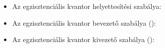 \begin{itemize}
\item Az egzisztenciális kvantor helyettesítési szabálya:
\begin{code}%
%
\>[6]\AgdaSpace{}%
\AgdaSymbol{:}\AgdaSpace{}%
\AgdaSpace{}%
\AgdaSpace{}%
\AgdaSymbol{\}\{}\AgdaSpace{}%
\AgdaSymbol{:}\AgdaSpace{}%
\AgdaSpace{}%
\AgdaSpace{}%
\AgdaSymbol{\}}\AgdaSpace{}%
\AgdaSpace{}%
\AgdaSpace{}%
\AgdaSpace{}%
\AgdaOperator{\AgdaField{[}}\AgdaSpace{}%
\AgdaSpace{}%
\AgdaOperator{\AgdaField{]ᶠ}}\AgdaSpace{}%
\AgdaSpace{}%
\AgdaSpace{}%
\AgdaSymbol{(}\AgdaSpace{}%
\AgdaOperator{\AgdaField{[}}\AgdaSpace{}%
\AgdaSpace{}%
\AgdaSpace{}%
\AgdaSpace{}%
\AgdaSpace{}%
\AgdaSpace{}%
\AgdaOperator{\AgdaField{]ᶠ}}\AgdaSymbol{)}\<%
\end{code}
\item Az egzisztenciális kvantor bevezető szabálya ():
\begin{code}%
%
\>[6]\AgdaSpace{}%
\AgdaSymbol{:}\AgdaSpace{}%
\AgdaSpace{}%
\AgdaSymbol{\}}\AgdaSpace{}%
\AgdaSpace{}%
\AgdaSymbol{(}\AgdaSpace{}%
\AgdaSymbol{:}\AgdaSpace{}%
\AgdaSpace{}%
\AgdaSymbol{)}\AgdaSpace{}%
\AgdaSpace{}%
\AgdaSpace{}%
\AgdaSpace{}%
\AgdaSymbol{(}\AgdaSpace{}%
\AgdaOperator{\AgdaField{[}}\AgdaSpace{}%
\AgdaSpace{}%
\AgdaSpace{}%
\AgdaSpace{}%
\AgdaOperator{\AgdaField{]ᶠ}}\AgdaSymbol{)}\AgdaSpace{}%
\AgdaSpace{}%
\AgdaSpace{}%
\AgdaSpace{}%
\AgdaSymbol{(}\AgdaSpace{}%
\AgdaSymbol{)}\<%
\end{code}
\item Az egzisztenciális kvantor kivezető szabálya ():
\begin{code}%
%
\>[6]%
\>[951I]\AgdaSymbol{:}\AgdaSpace{}%
\AgdaSpace{}%
\AgdaSpace{}%
\AgdaSymbol{\}}\AgdaSpace{}%
\AgdaSpace{}%
\AgdaSpace{}%
\AgdaSymbol{(}\AgdaSpace{}%
\AgdaSpace{}%

\end{code}
\end{itemize}
